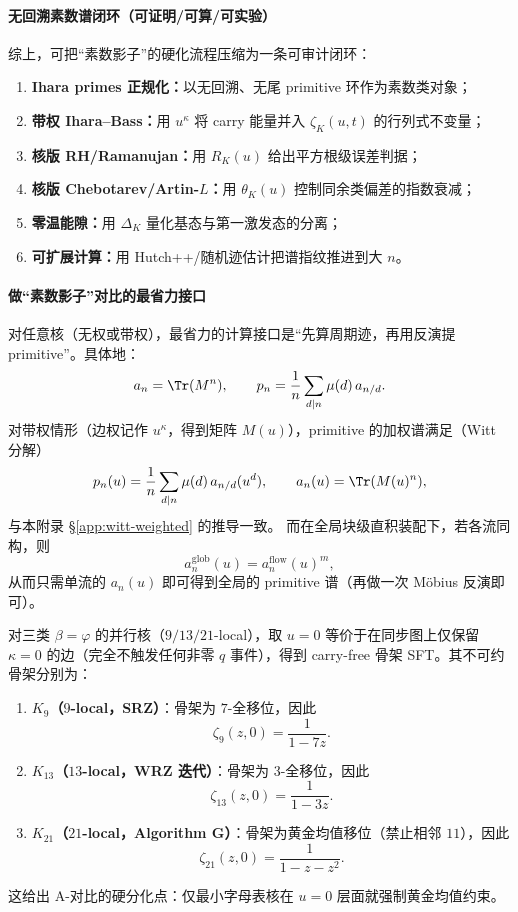 \paragraph{无回溯素数谱闭环（可证明/可算/可实验）}
综上，可把“素数影子”的硬化流程压缩为一条可审计闭环：
\begin{enumerate}
  \item \textbf{Ihara primes 正规化：}以无回溯、无尾 primitive 环作为素数类对象；
  \item \textbf{带权 Ihara--Bass：}用 $u^{\kappa}$ 将 carry 能量并入 $\zeta_K(u,t)$ 的行列式不变量；
  \item \textbf{核版 RH/Ramanujan：}用 $R_K(u)$ 给出平方根级误差判据；
  \item \textbf{核版 Chebotarev/Artin-$L$：}用 $\theta_K(u)$ 控制同余类偏差的指数衰减；
  \item \textbf{零温能隙：}用 $\Delta_K$ 量化基态与第一激发态的分离；
  \item \textbf{可扩展计算：}用 Hutch++/随机迹估计把谱指纹推进到大 $n$。
\end{enumerate}

\paragraph{做“素数影子”对比的最省力接口}
对任意核（无权或带权），最省力的计算接口是“先算周期迹，再用反演提 primitive”。具体地：
\[
a_n=\Tr(M^n),\qquad
p_n=\frac{1}{n}\sum_{d\mid n}\mu(d)\,a_{n/d}.
\]
对带权情形（边权记作 $u^{\kappa}$，得到矩阵 $M(u)$），primitive 的加权谱满足（Witt 分解）
\[
p_n(u)=\frac{1}{n}\sum_{d\mid n}\mu(d)\,a_{n/d}(u^d),
\qquad a_n(u)=\Tr(M(u)^n),
\]
与本附录 \S\ref{app:witt-weighted} 的推导一致。
而在全局块级直积装配下，若各流同构，则
\[
a_n^{\mathrm{glob}}(u)=a_n^{\mathrm{flow}}(u)^m,
\]
从而只需单流的 $a_n(u)$ 即可得到全局的 primitive 谱（再做一次 Möbius 反演即可）。

\begin{proposition}\label{prop:carry-free-skeleton-three}
对三类 $\beta=\varphi$ 的并行核（$9/13/21$-local），取 $u=0$ 等价于在同步图上仅保留 $\kappa=0$ 的边（完全不触发任何非零 $q$ 事件），得到 carry-free 骨架 SFT。其不可约骨架分别为：
\begin{enumerate}
  \item \textbf{$K_9$（$9$-local，SRZ）}：骨架为 $7$-全移位，因此
  \[
  \zeta_{9}(z,0)=\frac{1}{1-7z}.
  \]
  \item \textbf{$K_{13}$（$13$-local，WRZ 迭代）}：骨架为 $3$-全移位，因此
  \[
  \zeta_{13}(z,0)=\frac{1}{1-3z}.
  \]
  \item \textbf{$K_{21}$（$21$-local，Algorithm G）}：骨架为黄金均值移位（禁止相邻 $11$），因此
  \[
  \zeta_{21}(z,0)=\frac{1}{1-z-z^2}.
  \]
\end{enumerate}
这给出 A-对比的硬分化点：仅最小字母表核在 $u=0$ 层面就强制黄金均值约束。
\end{proposition}


